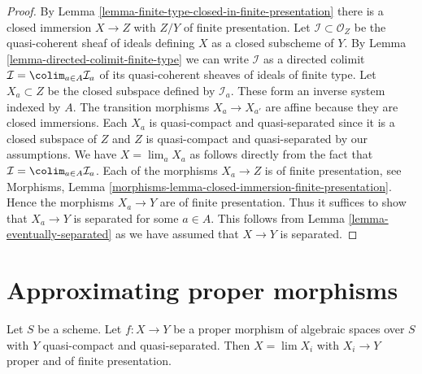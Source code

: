 \begin{proof}
By Lemma \ref{lemma-finite-type-closed-in-finite-presentation}
there is a closed immersion $X \to Z$ with $Z/Y$ of
finite presentation. Let $\mathcal{I} \subset \mathcal{O}_Z$
be the quasi-coherent sheaf of ideals defining $X$ as a closed
subscheme of $Y$. By
Lemma \ref{lemma-directed-colimit-finite-type}
we can write $\mathcal{I}$ as a directed colimit
$\mathcal{I} = \colim_{a \in A} \mathcal{I}_a$ of its
quasi-coherent sheaves of ideals of finite type.
Let $X_a \subset Z$ be the closed subspace defined by $\mathcal{I}_a$.
These form an inverse system indexed by $A$.
The transition morphisms $X_a \to X_{a'}$ are affine because
they are closed immersions. Each $X_a$ is quasi-compact and quasi-separated
since it is a closed subspace of $Z$ and $Z$ is quasi-compact and
quasi-separated by our assumptions.
We have $X = \lim_a X_a$ as follows directly from the
fact that $\mathcal{I} = \colim_{a \in A} \mathcal{I}_a$.
Each of the morphisms $X_a \to Z$ is of finite presentation, see
Morphisms, Lemma \ref{morphisms-lemma-closed-immersion-finite-presentation}.
Hence the morphisms $X_a \to Y$ are of finite presentation.
Thus it suffices to show that $X_a \to Y$ is separated for some
$a \in A$. This follows from Lemma \ref{lemma-eventually-separated}
as we have assumed that $X \to Y$ is separated.
\end{proof}






\section{Approximating proper morphisms}
\label{section-approximate-proper}

\begin{lemma}
\label{lemma-proper-limit-of-proper-finite-presentation}
Let $S$ be a scheme. Let $f : X \to Y$ be a proper morphism of algebraic
spaces over $S$ with $Y$ quasi-compact and quasi-separated. Then
$X = \lim X_i$ with $X_i \to Y$ proper and
of finite presentation.
\end{lemma}

